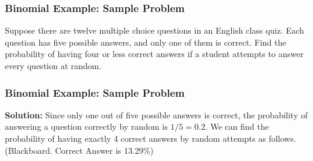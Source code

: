 \documentclass[IntroMain.tex]{subfiles}
\begin{document}

\begin{frame}[fragile]
\frametitle{Binomial Example: Sample Problem}

Suppose there are twelve multiple choice questions in an English class quiz. Each question has five possible answers, and only one of them is correct. Find the probability of having four or less correct answers if a student attempts to answer every question at random.
\end{frame}


\begin{frame}[fragile]
	\frametitle{Binomial Example: Sample Problem}

\textbf{Solution:}
Since only one out of five possible answers is correct, the probability of answering a question correctly by random is $1/5=0.2$. We can find the probability of having exactly 4 correct answers by random attempts as follows.(Blackboard. Correct Answer is 13.29\%)
\end{frame}
\end{document}
